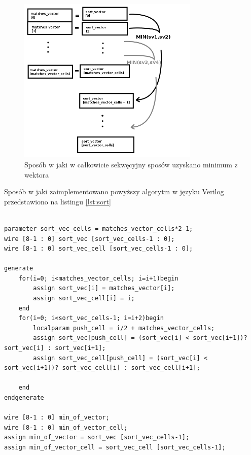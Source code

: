 \begin{figure}[h]
    \begin{center}

    \includegraphics[height = 8cm]{figures/combinational_minimum.png}
    \caption["Minimum kombinacyjne"]{Sposób w jaki w całkowicie sekwęcyjny sposów
    uzyskano minimum z wektora}
    \label{fig:combmin}
    \end{center}
\end{figure}


Sposób w jaki zaimplementowano powyższy algorytm w języku Verilog przedstawiono na
listingu \ref{lst:sort}

\begin{lstlisting}[label={lst:sort},
caption={kombinacyjne wybieranie najmniejszego elementu wektora w języku Verilog}]

parameter sort_vec_cells = matches_vector_cells*2-1;
wire [8-1 : 0] sort_vec [sort_vec_cells-1 : 0];
wire [8-1 : 0] sort_vec_cell [sort_vec_cells-1 : 0];

generate
    for(i=0; i<matches_vector_cells; i=i+1)begin
        assign sort_vec[i] = matches_vector[i];
        assign sort_vec_cell[i] = i;
    end
    for(i=0; i<sort_vec_cells-1; i=i+2)begin
        localparam push_cell = i/2 + matches_vector_cells;
        assign sort_vec[push_cell] = (sort_vec[i] < sort_vec[i+1])? sort_vec[i] : sort_vec[i+1];
        assign sort_vec_cell[push_cell] = (sort_vec[i] < sort_vec[i+1])? sort_vec_cell[i] : sort_vec_cell[i+1];

    end
endgenerate

wire [8-1 : 0] min_of_vector;
wire [8-1 : 0] min_of_vector_cell;
assign min_of_vector = sort_vec [sort_vec_cells-1];
assign min_of_vector_cell = sort_vec_cell [sort_vec_cells-1];


\end{lstlisting}


